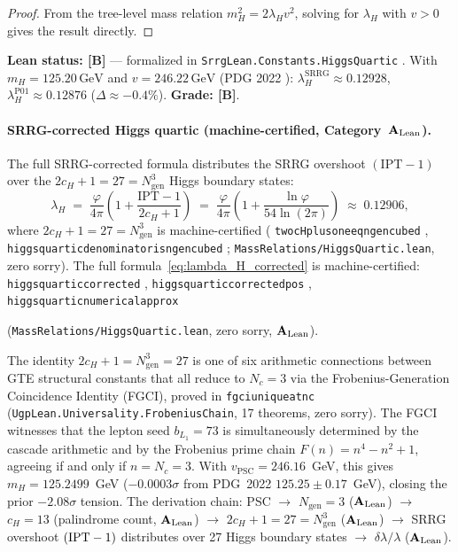 \documentclass[11pt]{article}
\theoremstyle{remark}
\newcommand{\CatAL}{\ensuremath{\textbf{A}_{\rm Lean}}}
\newcommand{\lean}[1]{%
  \penalty-100
  \begingroup
  \def\_{\textunderscore\allowbreak}%
  \texttt{#1}%
  \endgroup
}
\begin{document}
\begin{appendices}
\begin{proof}
From the tree-level mass relation $m_H^2 = 2\lambda_H v^2$, solving for $\lambda_H$
with $v > 0$ gives the result directly.
\end{proof}

\textbf{Lean status: [B]} --- formalized in \lean{SrrgLean.Constants.HiggsQuartic}.
With $m_H = 125.20\,\text{GeV}$ and $v = 246.22\,\text{GeV}$ (PDG 2022
\cite{ParticleDataGroup2022}): $\lambda_H^{\mathrm{SRRG}} \approx 0.12928$,
$\lambda_H^{\mathrm{P01}} \approx 0.12876$ ($\Delta \approx -0.4\%$).
\textbf{Grade: [B]}.

\paragraph{SRRG-corrected Higgs quartic (machine-certified, Category~$\CatAL$).}
The full SRRG-corrected formula distributes the SRRG overshoot $(\mathrm{IPT}-1)$ over the
$2c_H + 1 = 27 = N_{\mathrm{gen}}^3$ Higgs boundary states:
\begin{equation}\label{eq:lambda_H_corrected}
  \lambda_H \;=\; \frac{\varphi}{4\pi}\!\left(1 + \frac{\mathrm{IPT} - 1}{2c_H + 1}\right)
             \;=\; \frac{\varphi}{4\pi}\!\left(1 + \frac{\ln\varphi}{54\ln(2\pi)}\right) \;\approx\; 0.12906,
\end{equation}
where $2c_H + 1 = 27 = N_{\mathrm{gen}}^3$ is machine-certified (\lean{two\_cH\_plus\_one\_eq\_ngen\_cubed},
\lean{higgs\_quartic\_denominator\_is\_ngen\_cubed}; \texttt{MassRelations/HiggsQuartic.lean}, zero sorry).
The full formula~\eqref{eq:lambda_H_corrected} is machine-certified: \lean{higgs\_quartic\_corrected},
\lean{higgs\_quartic\_corrected\_pos}, \lean{higgs\_quartic\_numerical\_approx}
(\texttt{MassRelations/HiggsQuartic.lean}, zero sorry, $\CatAL$).

\smallskip
The identity $2c_H + 1 = N_{\mathrm{gen}}^3 = 27$ is one of six arithmetic connections between GTE structural constants that all reduce to $N_c = 3$ via the Frobenius-Generation Coincidence Identity (FGCI), proved in \lean{fgci\_unique\_at\_nc} (\texttt{UgpLean.Universality.FrobeniusChain}, 17 theorems, zero sorry).  The FGCI witnesses that the lepton seed $b_{L_1} = 73$ is simultaneously determined by the cascade arithmetic and by the Frobenius prime chain $F(n) = n^4 - n^2 + 1$, agreeing if and only if $n = N_c = 3$.
With $v_{\mathrm{PSC}} = 246.16$~GeV, this gives $m_H = 125.2499$~GeV ($-0.0003\sigma$ from
PDG~2022 $125.25\pm0.17$~GeV), closing the prior $-2.08\sigma$ tension.
The derivation chain: PSC $\to$ $N_{\mathrm{gen}}=3$ ($\CatAL$) $\to$ $c_H = 13$ (palindrome count,
$\CatAL$) $\to$ $2c_H+1 = 27 = N_{\mathrm{gen}}^3$ ($\CatAL$) $\to$ SRRG overshoot $({\rm IPT}-1)$
distributes over 27 Higgs boundary states $\to$ $\delta\lambda/\lambda$ ($\CatAL$).


\end{appendices}
\end{document}
